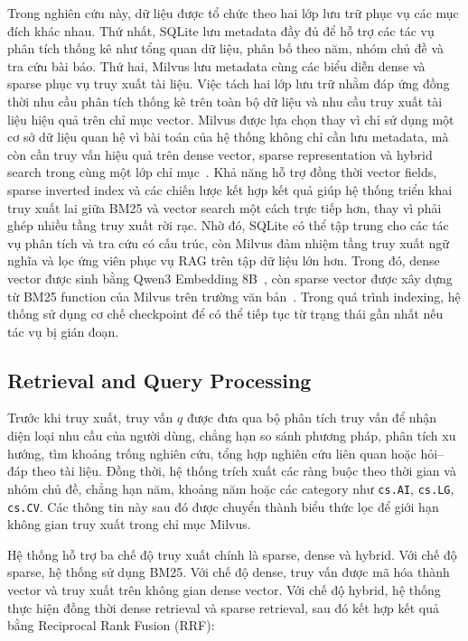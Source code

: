 \documentclass[conference]{IEEEtran}
\begin{document}
Trong nghiên cứu này, dữ liệu được tổ chức theo hai lớp lưu trữ phục vụ các mục đích khác nhau. Thứ nhất, SQLite lưu metadata đầy đủ để hỗ trợ các tác vụ phân tích thống kê như tổng quan dữ liệu, phân bố theo năm, nhóm chủ đề và tra cứu bài báo. Thứ hai, Milvus lưu metadata cùng các biểu diễn dense và sparse phục vụ truy xuất tài liệu. Việc tách hai lớp lưu trữ nhằm đáp ứng đồng thời nhu cầu phân tích thống kê trên toàn bộ dữ liệu và nhu cầu truy xuất tài liệu hiệu quả trên chỉ mục vector. Milvus được lựa chọn thay vì chỉ sử dụng một cơ sở dữ liệu quan hệ vì bài toán của hệ thống không chỉ cần lưu metadata, mà còn cần truy vấn hiệu quả trên dense vector, sparse representation và hybrid search trong cùng một lớp chỉ mục~\cite{milvusHybrid2025}. Khả năng hỗ trợ đồng thời vector fields, sparse inverted index và các chiến lược kết hợp kết quả giúp hệ thống triển khai truy xuất lai giữa BM25 và vector search một cách trực tiếp hơn, thay vì phải ghép nhiều tầng truy xuất rời rạc. Nhờ đó, SQLite có thể tập trung cho các tác vụ phân tích và tra cứu có cấu trúc, còn Milvus đảm nhiệm tầng truy xuất ngữ nghĩa và lọc ứng viên phục vụ RAG trên tập dữ liệu lớn hơn. Trong đó, dense vector được sinh bằng Qwen3 Embedding 8B~\cite{qwen3embedding2025}, còn sparse vector được xây dựng từ BM25 function của Milvus trên trường văn bản~\cite{milvusHybrid2025}. Trong quá trình indexing, hệ thống sử dụng cơ chế checkpoint để có thể tiếp tục từ trạng thái gần nhất nếu tác vụ bị gián đoạn.

\subsection{Retrieval and Query Processing}

Trước khi truy xuất, truy vấn $q$ được đưa qua bộ phân tích truy vấn để nhận diện loại nhu cầu của người dùng, chẳng hạn so sánh phương pháp, phân tích xu hướng, tìm khoảng trống nghiên cứu, tổng hợp nghiên cứu liên quan hoặc hỏi--đáp theo tài liệu. Đồng thời, hệ thống trích xuất các ràng buộc theo thời gian và nhóm chủ đề, chẳng hạn năm, khoảng năm hoặc các category như \texttt{cs.AI}, \texttt{cs.LG}, \texttt{cs.CV}. Các thông tin này sau đó được chuyển thành biểu thức lọc để giới hạn không gian truy xuất trong chỉ mục Milvus.

Hệ thống hỗ trợ ba chế độ truy xuất chính là sparse, dense và hybrid. Với chế độ sparse, hệ thống sử dụng BM25. Với chế độ dense, truy vấn được mã hóa thành vector và truy xuất trên không gian dense vector. Với chế độ hybrid, hệ thống thực hiện đồng thời dense retrieval và sparse retrieval, sau đó kết hợp kết quả bằng Reciprocal Rank Fusion (RRF):
\end{document}

